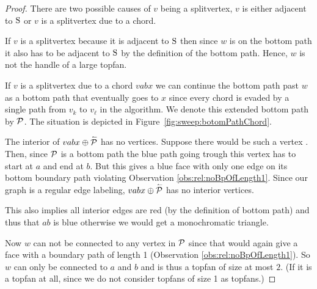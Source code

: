     \begin{proof}
      There are two possible causes of $v$ being a splitvertex, $v$ is either adjacent to $\pS$ or $v$ is a splitvertex due to a chord.

      If $v$ is a splitvertex because it is adjacent to $\pS$ then since $w$ is on the bottom path it also has to be adjacent to $\pS$ by the definition of the bottom path.
      Hence, $w$ is not the handle of a large topfan.

      If $v$ is a splitvertex due to a chord $v a b x$ we can continue the bottom path past $w$ as a bottom path that eventually goes to $x$ since every chord is evaded by a single path from $v_k$ to $v_\ell$ in the algorithm.
      We denote this extended bottom path by $\P$.
      The situation is depicted in Figure~\ref{fig:sweep:botomPathChord}.

      The interior of  $vabx \oplus \rev \P$ has no vertices. Suppose there would be such a vertex . Then, since $\P$ is a bottom path the blue path going trough this vertex has to start at $a$ and end at $b$. But this gives a blue face with only one edge on its bottom boundary path violating Observation \ref{obs:rel:noBpOfLength1}. Since our graph is a regular edge labeling, $vabx \oplus \rev \P$ has no interior vertices.

      This also implies all interior edges are red (by the definition of bottom path) and thus that $ab$ is blue otherwise we would get a monochromatic triangle.

      Now $w$ can not be connected to any vertex in $\P$ since that would again give a face with a boundary path of length 1 (Observation \ref{obs:rel:noBpOfLength1}).
      So $w$ can only be connected to $a$ and $b$ and is thus a topfan of size at most $2$.
      (If it is a topfan at all, since we do not consider topfans of size 1 as topfans.)
    \end{proof}

